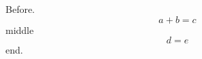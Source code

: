 \documentclass[10pt]{article}
\begin{document}
Before.
\begin{equation} a + b = c \tag*{$\pm$ note} \end{equation}
middle
\begin{equation} d = e \tag*{[$n+1$]} \end{equation}
end.
\end{document}
